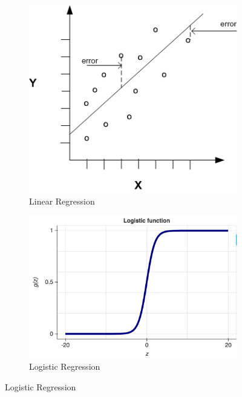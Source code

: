 \documentclass[aspectratio=169, 10pt]{beamer}
\begin{document}
\begin{frame}[t]
    \begin{figure}
        \centering
        \small
        \begin{subfigure}[t]{0.25\linewidth}
            \captionsetup{justification=centering}
            \includegraphics[width=\linewidth]{../imgs/Linear-regression.png}
            \caption{Linear Regression}
        \end{subfigure}
        \begin{subfigure}[t]{0.30\linewidth}
            \captionsetup{justification=centering}
            \includegraphics[width=\linewidth]{../imgs/lr.png}
            \caption{Logistic Regression}

\end{subfigure}
\end{figure}
\end{frame}
\end{document}
